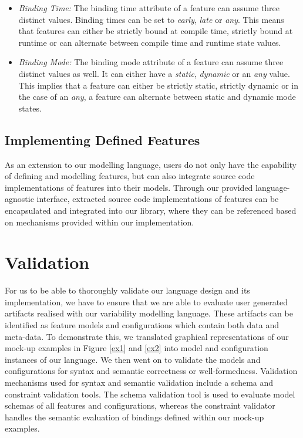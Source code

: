 \documentclass[conference]{IEEEtran}
\begin{document}
\begin{itemize}
\begin{itemize}
    \item \textit{Binding Time:} The binding time attribute of a feature can assume three distinct values. Binding times can be set to \textit{early}, \textit{late} or \textit{any}. This means that features can either be strictly bound at compile time, strictly bound at runtime or can alternate between compile time and runtime state values.
    
    \item \textit{Binding Mode:} The binding mode attribute of a feature can assume three distinct values as well. It can either have a \textit{static}, \textit{dynamic} or an \textit{any} value. This implies that a feature can either be strictly static, strictly dynamic or in the case of an \textit{any}, a feature can alternate between static and dynamic mode states.
\end{itemize}

\end{itemize}

\subsection{Implementing Defined Features}
As an extension to our modelling language, users do not only have the capability of defining and modelling features, but can also integrate source code implementations of features into their models. Through our provided language-agnostic interface, extracted source code implementations of features can be encapsulated and integrated into our library, where they can be referenced based on mechanisms provided within our implementation.

\section{Validation}
For us to be able to thoroughly validate our language design and its implementation, we have to ensure that we are able to evaluate user generated artifacts realised with our variability modelling language. These artifacts can be identified as feature models and configurations which contain both data and meta-data. To demonstrate this, we translated graphical representations of our mock-up examples in Figure \ref{ex1} and \ref{ex2} into model and configuration instances of our language. We then went on to validate the models and configurations for syntax and semantic correctness or well-formedness. Validation mechanisms used for syntax and semantic validation include a schema and constraint validation tools. The schema validation tool is used to evaluate model schemas of all features and configurations, whereas the constraint validator handles the semantic evaluation of bindings defined within our mock-up examples.
\end{document}

